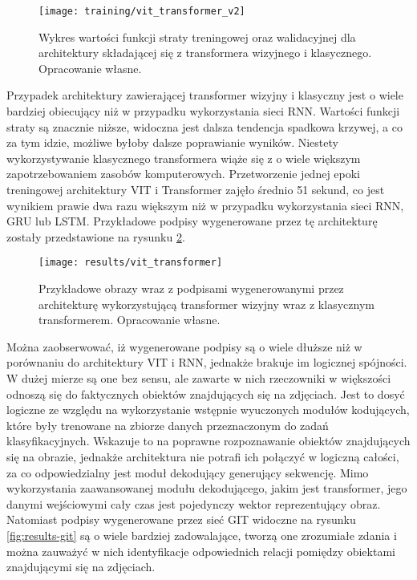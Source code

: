 \begin{figure}[H]
    \centering
    \texttt{[image: training/vit\_transformer\_v2]}
    \caption{Wykres wartości funkcji straty treningowej oraz walidacyjnej dla architektury składającej się z transformera wizyjnego i klasycznego. Opracowanie własne.}
    \label{fig:training-vit-transformer}
\end{figure}
\noindent Przypadek architektury zawierającej transformer wizyjny i klasyczny jest o wiele bardziej obiecujący niż w przypadku wykorzystania sieci RNN. Wartości funkcji straty są znacznie niższe, widoczna jest dalsza tendencja spadkowa krzywej, a co za tym idzie, możliwe byłoby dalsze poprawianie wyników. Niestety wykorzystywanie klasycznego transformera wiąże się z o wiele większym zapotrzebowaniem zasobów komputerowych. Przetworzenie jednej epoki treningowej architektury VIT i Transformer zajęło średnio 51 sekund, co jest wynikiem prawie dwa razu większym niż w przypadku wykorzystania sieci RNN, GRU lub LSTM. Przykładowe podpisy wygenerowane przez tę architekturę zostały przedstawione na rysunku \ref{fig:results-vit-transformer}.
\begin{figure}[H]
    \centering
    \texttt{[image: results/vit\_transformer]}
    \caption{Przykładowe obrazy wraz z podpisami wygenerowanymi przez architekturę wykorzystującą transformer wizyjny wraz z klasycznym transformerem. Opracowanie własne.}
    \label{fig:results-vit-transformer}
\end{figure}
\noindent Można zaobserwować, iż wygenerowane podpisy są o wiele dłuższe niż w porównaniu do architektury VIT i RNN, jednakże brakuje im logicznej spójności. W dużej mierze są one bez sensu, ale zawarte w nich rzeczowniki w większości odnoszą się do faktycznych obiektów znajdujących się na zdjęciach. Jest to dosyć logiczne ze względu na wykorzystanie wstępnie wyuczonych modułów kodujących, które były trenowane na zbiorze danych przeznaczonym do zadań klasyfikacyjnych. Wskazuje to na poprawne rozpoznawanie obiektów znajdujących się na obrazie, jednakże architektura nie potrafi ich połączyć w logiczną całości, za co odpowiedzialny jest moduł dekodujący generujący sekwencję. Mimo wykorzystania zaawansowanej modułu dekodującego, jakim jest transformer, jego danymi wejściowymi cały czas jest pojedynczy wektor reprezentujący obraz. Natomiast podpisy wygenerowane przez sieć GIT widoczne na rysunku \ref{fig:results-git} są o wiele bardziej zadowalające, tworzą one zrozumiałe zdania i można zauważyć w nich identyfikacje odpowiednich relacji pomiędzy obiektami znajdującymi się na zdjęciach.
